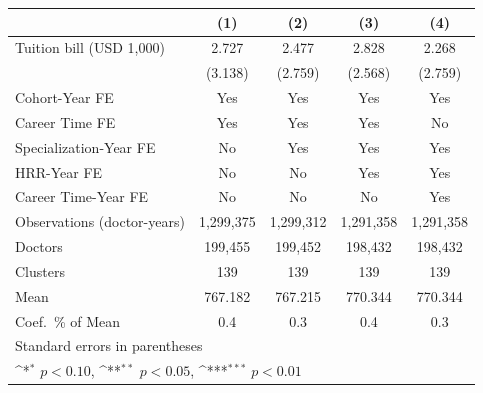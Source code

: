 {
\def\sym#1{\ifmmode^{#1}\else\(^{#1}\)\fi}
\begin{tabular}{l*{4}{c}}
\hline\hline
                    &\multicolumn{1}{c}{(1)}         &\multicolumn{1}{c}{(2)}         &\multicolumn{1}{c}{(3)}         &\multicolumn{1}{c}{(4)}         \\
\hline
Tuition bill (USD 1,000)&       2.727         &       2.477         &       2.828         &       2.268         \\
                    &     (3.138)         &     (2.759)         &     (2.568)         &     (2.759)         \\
[1em]
Cohort-Year FE      &         Yes         &         Yes         &         Yes         &         Yes         \\
[1em]
Career Time FE      &         Yes         &         Yes         &         Yes         &          No         \\
[1em]
Specialization-Year FE&          No         &         Yes         &         Yes         &         Yes         \\
[1em]
HRR-Year FE         &          No         &          No         &         Yes         &         Yes         \\
[1em]
Career Time-Year FE &          No         &          No         &          No         &         Yes         \\
\hline
Observations (doctor-years)&   1,299,375         &   1,299,312         &   1,291,358         &   1,291,358         \\
Doctors             &     199,455         &     199,452         &     198,432         &     198,432         \\
Clusters            &         139         &         139         &         139         &         139         \\
Mean                &     767.182         &     767.215         &     770.344         &     770.344         \\
Coef.\ \% of Mean   &         0.4         &         0.3         &         0.4         &         0.3         \\
\hline\hline
\multicolumn{5}{l}{\footnotesize Standard errors in parentheses}\\
\multicolumn{5}{l}{\footnotesize \sym{*} \(p<0.10\), \sym{**} \(p<0.05\), \sym{***} \(p<0.01\)}\\
\end{tabular}
}
